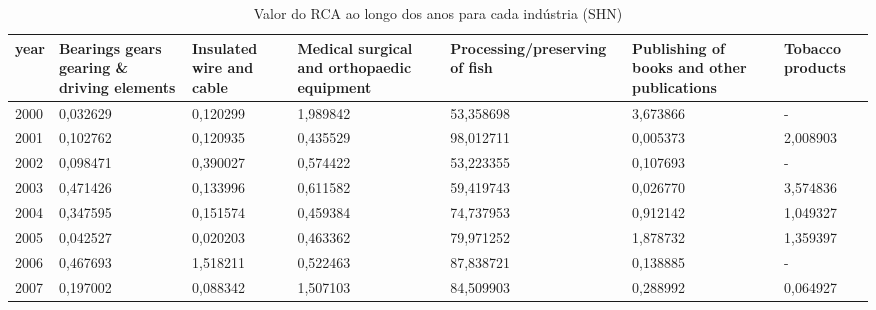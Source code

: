 \begin{table}
\centering
\caption{Valor do RCA ao longo dos anos para cada indústria (SHN)}
\begin{tabular}{p{1cm}p{2cm}p{2cm}p{2cm}p{2cm}p{2cm}p{2cm}}
\toprule
 year &  Bearings gears gearing \& driving elements &  Insulated wire and cable &  Medical surgical and orthopaedic equipment &  Processing/preserving of fish &  Publishing of books and other publications &  Tobacco products \\
\midrule
 2000 &                                   0,032629 &                  0,120299 &                                    1,989842 &                      53,358698 &                                    3,673866 &                 - \\
 2001 &                                   0,102762 &                  0,120935 &                                    0,435529 &                      98,012711 &                                    0,005373 &          2,008903 \\
 2002 &                                   0,098471 &                  0,390027 &                                    0,574422 &                      53,223355 &                                    0,107693 &                 - \\
 2003 &                                   0,471426 &                  0,133996 &                                    0,611582 &                      59,419743 &                                    0,026770 &          3,574836 \\
 2004 &                                   0,347595 &                  0,151574 &                                    0,459384 &                      74,737953 &                                    0,912142 &          1,049327 \\
 2005 &                                   0,042527 &                  0,020203 &                                    0,463362 &                      79,971252 &                                    1,878732 &          1,359397 \\
 2006 &                                   0,467693 &                  1,518211 &                                    0,522463 &                      87,838721 &                                    0,138885 &                 - \\
 2007 &                                   0,197002 &                  0,088342 &                                    1,507103 &                      84,509903 &                                    0,288992 &          0,064927 \\

\end{tabular}
\end{table}
